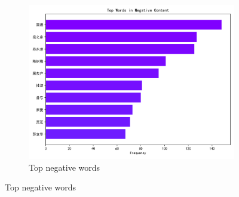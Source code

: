 \documentclass[12pt]{article}
\begin{document}
\begin{figure}[!ht]
\begin{subfigure}[b]{0.32\textwidth}
	\includegraphics[width=\linewidth]{top_words_negative.png}
	\caption{Top negative words}
	\end{subfigure}
\end{figure}
\end{document}
